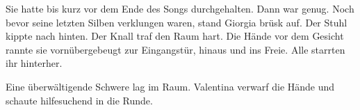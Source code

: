 
Sie hatte bis kurz vor dem Ende des Songs durchgehalten. Dann war genug. Noch bevor seine
letzten Silben verklungen waren, stand Giorgia brüsk auf. Der Stuhl
kippte nach hinten. Der Knall traf den Raum hart. Die Hände vor dem
Gesicht rannte sie vornübergebeugt zur Eingangstür, hinaus und ins
Freie. Alle starrten ihr hinterher.

Eine überwältigende Schwere lag im Raum.
Valentina verwarf die Hände und schaute hilfesuchend in die Runde.
